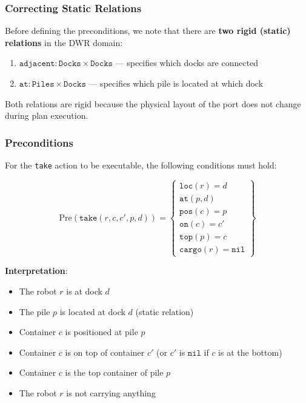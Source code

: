 \documentclass[11pt,a4paper]{article}
\theoremstyle{definition}
\theoremstyle{plain}
\theoremstyle{remark}
\begin{document}
\subsubsection{Correcting Static Relations}

Before defining the preconditions, we note that there are \textbf{two rigid (static) relations} in the DWR domain:

\begin{enumerate}
    \item $\texttt{adjacent}: \texttt{Docks} \times \texttt{Docks}$ — specifies which docks are connected
    \item $\texttt{at}: \texttt{Piles} \times \texttt{Docks}$ — specifies which pile is located at which dock
\end{enumerate}

Both relations are rigid because the physical layout of the port does not change during plan execution.

\subsubsection{Preconditions}

For the \texttt{take} action to be executable, the following conditions must hold:

\[
\text{Pre}(\texttt{take}(r, c, c', p, d)) = \left\{
\begin{array}{l}
\texttt{loc}(r) = d \\
\texttt{at}(p, d) \\
\texttt{pos}(c) = p \\
\texttt{on}(c) = c' \\
\texttt{top}(p) = c \\
\texttt{cargo}(r) = \texttt{nil}
\end{array}
\right\}
\]

\textbf{Interpretation}:
\begin{itemize}
    \item The robot $r$ is at dock $d$
    \item The pile $p$ is located at dock $d$ (static relation)
    \item Container $c$ is positioned at pile $p$
    \item Container $c$ is on top of container $c'$ (or $c'$ is $\texttt{nil}$ if $c$ is at the bottom)
    \item Container $c$ is the top container of pile $p$
    \item The robot $r$ is not carrying anything
\end{itemize}
\end{document}
